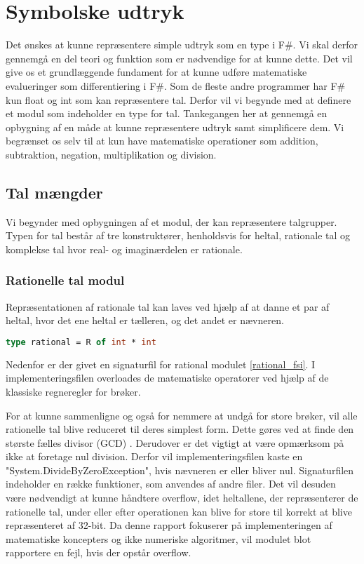 \section{Symbolske udtryk}
Det ønskes at kunne repræsentere simple udtryk som en type i F\#. Vi skal derfor gennemgå en del teori og funktion som er nødvendige for at kunne dette. Det vil give os et grundlæggende fundament for at kunne udføre matematiske evalueringer som differentiering i F\#. Som de fleste andre programmer har F\# kun float og int som kan repræsentere tal. Derfor vil vi begynde med at definere et modul som indeholder en type for tal. Tankegangen her at gennemgå en opbygning af en måde at kunne repræsentere udtryk samt simplificere dem. Vi begrænset os selv til at kun have matematiske operationer som addition, subtraktion, negation, multiplikation og division.

\subsection{Tal mængder}
Vi begynder med opbygningen af et modul, der kan repræsentere talgrupper. Typen for tal består af tre konstruktører, henholdsvis for heltal, rationale tal og komplekse tal hvor real- og imaginærdelen er rationale. 

\subsubsection{Rationelle tal modul}
Repræsentationen af rationale tal kan laves ved hjælp af at danne et par af heltal, hvor det ene heltal er tælleren, og det andet er nævneren.


\begin{lstlisting}[language={FSharp}, 
    label={type_rationel},
    caption={Typen for rationelle tal}]
type rational = R of int * int
\end{lstlisting}
Nedenfor er der givet en signaturfil for rational modulet \ref{rational_fsi}. I implementeringsfilen overloades de matematiske operatorer ved hjælp af de klassiske regneregler for brøker.


For at kunne sammenligne og også for nemmere at undgå for store brøker, vil alle rationelle tal blive reduceret til deres simplest form. Dette gøres ved at finde den største fælles divisor (GCD) . Derudover er det vigtigt at være opmærksom på ikke at foretage nul division. Derfor vil implementeringsfilen kaste en "System.DivideByZeroException", hvis nævneren er eller bliver nul. Signaturfilen indeholder en række funktioner, som anvendes af andre filer. Det vil desuden være nødvendigt at kunne håndtere overflow, idet heltallene, der repræsenterer de rationelle tal, under eller efter operationen kan blive for store til korrekt at blive repræsenteret af 32-bit. Da denne rapport fokuserer på implementeringen af matematiske koncepters og ikke numeriske algoritmer, vil modulet blot rapportere en fejl, hvis der opstår overflow.
 


